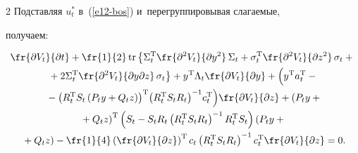 \begin{multicols}{2}
     Подставляя $u_t^*$ в~(\ref{e12-bos}) и~перегруппировывая слагаемые, 


получаем:





\vspace*{-6pt}





     \begin{multline}


     \fr{\partial V_t}{\partial t} +\fr{1}{2}\,\mathrm{tr} \left\{ \Sigma_t^{\mathrm{T}} 


\fr{\partial^2 V_t}{\partial y^2}\,\Sigma_t +\sigma_t^{\mathrm{T}}\fr{\partial^2 V_t}{\partial 


z^2}\,\sigma_t +{}\right.\\


\left.{}+2\Sigma_t^{\mathrm{T}} \fr{\partial^2 V_t}{\partial y\partial 


z}\,\sigma_t\right\} +y^{\mathrm{T}} \Lambda_t\fr{\partial V_t}{\partial y}+ 


\left(


\vphantom{\left( R_t^{\mathrm{T}} S_t\left( P_t y+Q_tz\right)\right)^{\mathrm{T}}}


 y^{\mathrm{T}} a_t^{\mathrm{T}} -{}\right.\\


\!\left.{}-\left( R_t^{\mathrm{T}} S_t\left( P_t y+Q_tz\right)\right)^{\mathrm{T}}\! \left( 


R_t^{\mathrm{T}} S_t R_t\right)^{-1}\! c_t^{\mathrm{T}}\right) \!\fr{\partial V_t}{\partial z}+


 \left( P_t y+{}\right.\hspace*{-3.5019pt}\\


\left. {}+Q_t z\right)^{\mathrm{T}} \left( S_t -S_t R_t\left( R_t^{\mathrm{T}} S_t 


R_t\right)^{-1} R_t^{\mathrm{T}} S_t\right) \left( P_t y+{}\right.\\


\!\!\!\left.{}+Q_t z\right)-\fr{1}{4}\left(\fr{\partial V_t}{\partial z}\right)^{\mathrm{T}} c_t 


     \left( R_t^{\mathrm{T}} S_t R_t\right)^{-1} c_t^{\mathrm{T}} \fr{\partial V_t}{\partial z}=0.\!\!\!


     \label{e14-bos}


     \end{multline}



\end{multicols}
